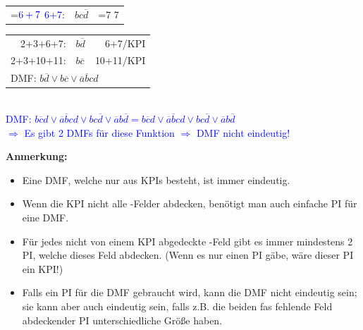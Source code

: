 \documentclass[10pt,a4paper]{scrartcl}
\newcommand\hcancel[2][black]{\setbox0=\hbox{$#2$}%
	\rlap{\raisebox{.45\ht0}{\textcolor{#1}{\rule{\wd0}{1pt}}}}#2}
\begin{document}
\begin{table}[h!]
\begin{tabular}{rlr}
		\hcancel[green]{\textcolor{blue}{6+7}}: & $ bc\overline{d} $ & \hcancel[green]7
	\end{tabular}
{\color{green}
	\begin{tabular}{rlr}
	2+3+6+7: & $ b \overline{d} $ & 6+7/\ac{KPI}\\
	2+3+10+11: & $ b \overline{c} $ & 10+11/\ac{KPI}\\
	\multicolumn{3}{l}{DMF: $ b \overline{d} \vee b \overline{c} \vee \overline{a} \overline{b}cd $}
	\end{tabular}
}
\\
\flushleft
\textcolor{blue}{DMF: $ b \overline{c}d \vee \overline{a} \overline{b} cd \vee bc\overline{d} \vee \overline{a} b \overline{d} = b\overline{c} d \vee \overline{a} \overline{b} c d \vee b c \overline{d} \vee \overline{a} b \overline{d}$}\\
\textcolor{blue}{$\Rightarrow$ Es gibt 2 \ac{DMF}s für diese Funktion $\Rightarrow$ \ac{DMF} nicht eindeutig!}
\end{table}

\textbf{Anmerkung:} 
\begin{itemize}
	\item Eine \ac{DMF}, welche nur aus \acp{KPI} besteht, ist immer eindeutig.
	\item Wenn die \ac{KPI} nicht alle \grqq-Felder abdecken, benötigt man auch einfache \ac{PI} für eine \ac{DMF}.
	\item Für jedes nicht von einem \ac{KPI} abgedeckte \grqq-Feld gibt es immer mindestens 2 \ac{PI}, welche dieses Feld abdecken. (Wenn es nur einen \ac{PI} gäbe, wäre dieser \ac{PI} ein \ac{KPI}!)
	\item Falls ein \ac{PI} für die \ac{DMF} gebraucht wird, kann die \ac{DMF} nicht eindeutig sein; sie kann aber auch eindeutig sein, falls z.B. die beiden fas fehlende Feld abdeckender \ac{PI} unterschiedliche Größe haben.
\end{itemize}
\end{document}
